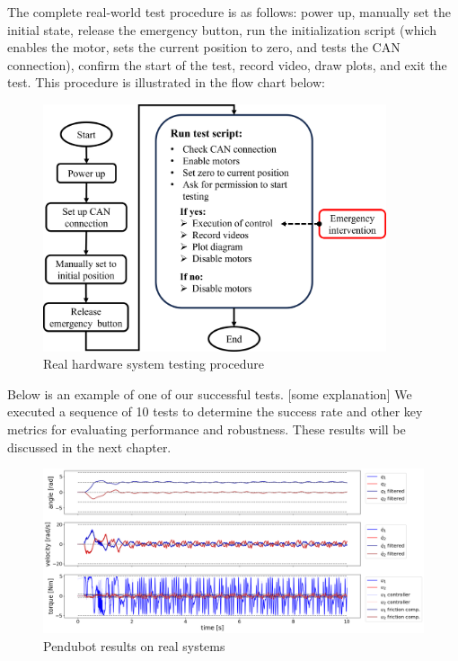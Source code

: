 The complete real-world test procedure is as follows: power up, manually set the initial state, release the emergency button, run the initialization script (which enables the motor, sets the current position to zero, and tests the CAN connection), confirm the start of the test, record video, draw plots, and exit the test. This procedure is illustrated in the flow chart below:

\begin{figure}[H]
    \centering
    \includegraphics[width=0.9\textwidth]{figures/hardware_setup/testing_procedure.png}%
    \caption{Real hardware system testing procedure}
    \label{fig:image_b}
\end{figure}

Below is an example of one of our successful tests. [some explanation] We executed a sequence of 10 tests to determine the success rate and other key metrics for evaluating performance and robustness. These results will be discussed in the next chapter. 

\begin{figure}[H]
    \centering
    \includegraphics[width=1.1\linewidth]{figures/hardware_result/pendubot_real_system_working.png}
    \caption{Pendubot results on real systems}
    \label{fig:my_label}
\end{figure}


\cleardoublepage
